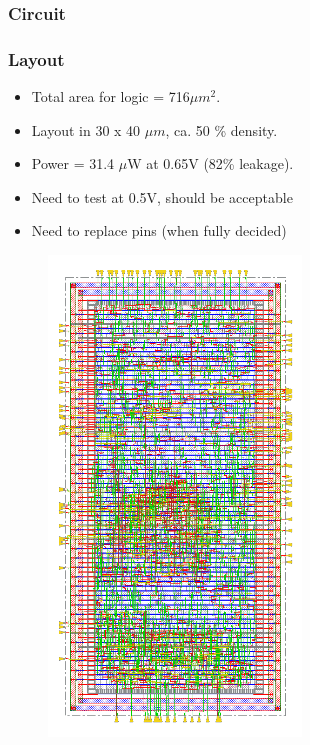 		\subsubsection{Circuit}
		\subsubsection{Layout}

			\begin{itemize}[itemsep=4pt,label=\protect---]
			        \item Total area for logic = 716$\mu m^2$.
			        \item Layout in 30 x 40 $\mu m$, ca. 50 \% density.
			        \item Power = 31.4 $\mu$W at 0.65V (82\% leakage).
			        \item Need to test at 0.5V, should be acceptable
			        \item Need to replace pins (when fully decided)
			\end{itemize}

			\begin{figure}[htb!]
			        \centering
			        \includegraphics[width=0.6\textwidth, angle=0]{./figs/pnr_digital}
			\end{figure}










